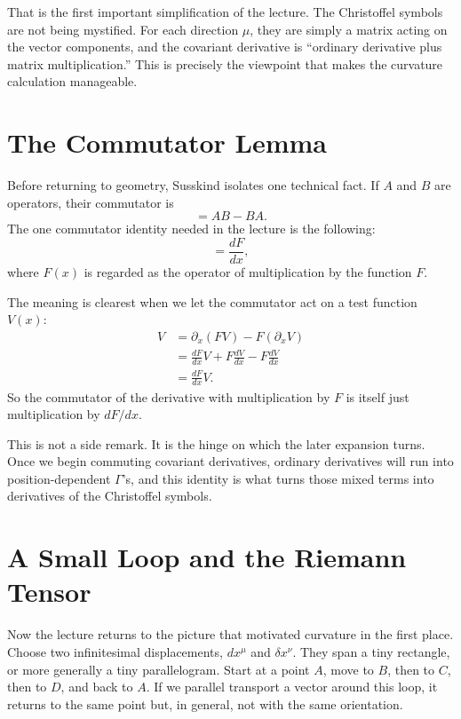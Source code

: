 That is the first important simplification of the lecture. The Christoffel symbols are not being mystified. For each direction \(\mu\), they are simply a matrix acting on the vector components, and the covariant derivative is ``ordinary derivative plus matrix multiplication.'' This is precisely the viewpoint that makes the curvature calculation manageable.

\section{The Commutator Lemma}

Before returning to geometry, Susskind isolates one technical fact. If \(A\) and \(B\) are operators, their commutator is
\begin{equation}
[A,B] = AB-BA.
\end{equation}
The one commutator identity needed in the lecture is the following:
\begin{equation}
[\partial_x,F(x)] = \frac{dF}{dx},
\end{equation}
where \(F(x)\) is regarded as the operator of multiplication by the function \(F\).

The meaning is clearest when we let the commutator act on a test function \(V(x)\):
\begin{align}
[\partial_x,F]V
&=
\partial_x(FV)-F(\partial_xV) \\
&=
\frac{dF}{dx}V + F\frac{dV}{dx} - F\frac{dV}{dx} \\
&=
\frac{dF}{dx}V.
\end{align}
So the commutator of the derivative with multiplication by \(F\) is itself just multiplication by \(dF/dx\).

This is not a side remark. It is the hinge on which the later expansion turns. Once we begin commuting covariant derivatives, ordinary derivatives will run into position-dependent \(\Gamma\)'s, and this identity is what turns those mixed terms into derivatives of the Christoffel symbols.

\section{A Small Loop and the Riemann Tensor}

Now the lecture returns to the picture that motivated curvature in the first place. Choose two infinitesimal displacements, \(dx^\mu\) and \(\delta x^\nu\). They span a tiny rectangle, or more generally a tiny parallelogram. Start at a point \(A\), move to \(B\), then to \(C\), then to \(D\), and back to \(A\). If we parallel transport a vector around this loop, it returns to the same point but, in general, not with the same orientation.

